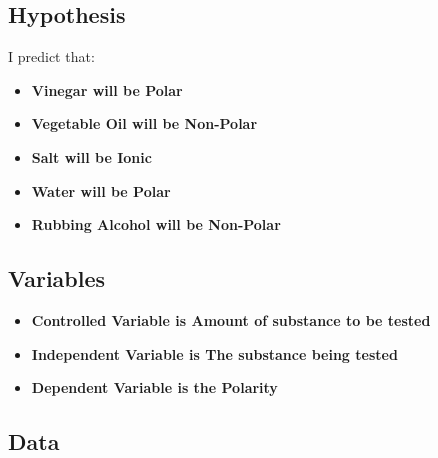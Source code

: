 \subsection{Hypothesis}

I predict that:

\begin{itemize}
  \item \bf{Vinegar} will be \bf{Polar}
  \item \bf{Vegetable Oil} will be \bf{Non-Polar}
  \item \bf{Salt} will be \bf{Ionic}
  \item \bf{Water} will be \bf{Polar}
  \item \bf{Rubbing Alcohol} will be \bf{Non-Polar}
\end{itemize}

\subsection{Variables}

\begin{itemize}
  \item \bf{Controlled Variable} is \bf{Amount of substance to be tested}
  \item \bf{Independent Variable} is \bf{The substance being tested}
  \item \bf{Dependent Variable} is the \bf{Polarity}
\end{itemize}

\subsection{Data}


